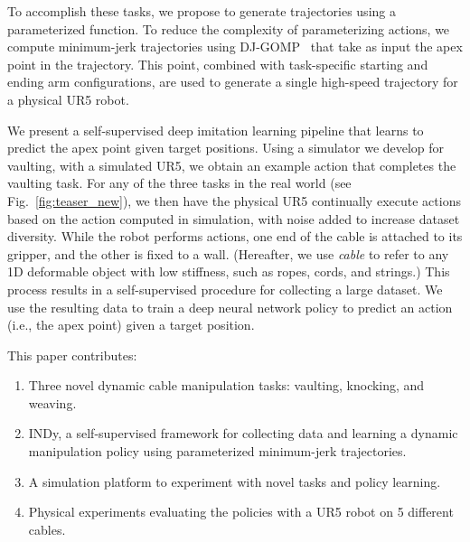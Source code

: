 % 
To accomplish these tasks, we propose to generate trajectories using a parameterized function. To reduce the complexity of parameterizing actions, we compute minimum-jerk trajectories using DJ-GOMP~\cite{GOMP, DJGOMP} that take as input the apex point in the trajectory.  This point, combined with task-specific starting and ending arm configurations, are used to generate a single high-speed trajectory for a physical UR5 robot. 

We present a self-supervised deep imitation learning pipeline that learns to predict the apex point given target positions. Using a simulator we develop for vaulting, with a simulated UR5, we obtain an example action that completes the vaulting task. For any of the three tasks in the real world (see Fig.~\ref{fig:teaser_new}), we then have the physical UR5 continually execute actions based on the action computed in simulation, with noise added to increase dataset diversity. While the robot performs actions, one end of the cable is attached to its gripper, and the other is fixed to a wall. (Hereafter, we use \emph{cable} to refer to any 1D deformable object with low stiffness, such as ropes, cords, and strings.) This process results in a self-supervised procedure for collecting a large dataset. We use the resulting data to train a deep neural network policy to predict an action (i.e., the apex point) given a target position. %

This paper contributes:
\begin{enumerate}
    \item Three novel dynamic cable manipulation tasks: vaulting, knocking, and weaving.
    \item INDy, a self-supervised framework for collecting data and learning a dynamic manipulation policy using parameterized minimum-jerk trajectories.
    \item A simulation platform to experiment with novel tasks and policy learning.
    \item Physical experiments evaluating the policies with a UR5 robot on 5 different cables.
\end{enumerate}



